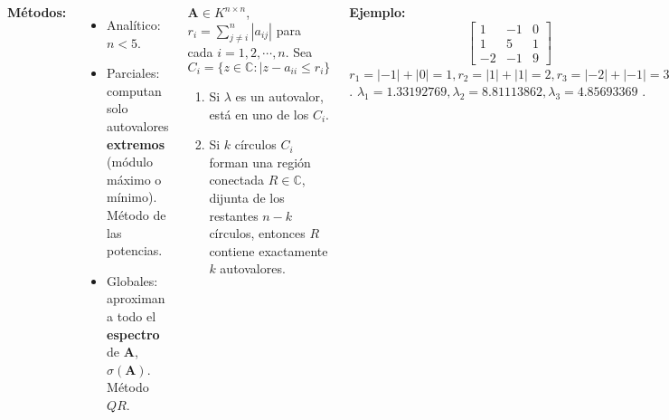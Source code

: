 \documentclass[9pt, aspectratio=169]{beamer}
\begin{document}
\begin{frame}
\begin{columns}[t]
\cx
\textbf{Métodos:}
\begin{itemize}
    \item Analítico: $n < 5$.
    \item Parciales: computan solo autovalores \textbf{extremos} (módulo máximo o mínimo). Método de las potencias.
    \item Globales: aproximan a todo el \textbf{espectro} de $\bm{A}$, $\sigma(\bm{A})$. Método $QR$.
\end{itemize}
\hrulefill \pause

\begin{theorem}
    $\bm{A} \in K^{n \times n}$, $r_i = \sum_{j \neq i}^n |a_{ij}|$ para cada $i = 1, 2, \cdots, n$. Sea
    \[ C_i = \{ z \in \mathbb{C} : |z - a_{ii} \leq r_i \} \]
    \vspace{-2em}
    \begin{enumerate}
        \item Si $\lambda$ es un autovalor, está en uno de los $C_i$.
        \item Si $k$ círculos $C_i$ forman una región conectada $R \in \mathbb{C}$, dijunta de los restantes $n - k$ círculos, entonces $R$ contiene exactamente $k$ autovalores.
    \end{enumerate}
\end{theorem} \pause

\cx
\textbf{Ejemplo:}
\[ \begin{bmatrix}
    1 & - 1 & 0 \\
    1 & 5 & 1 \\
    -2 & -1 & 9
\end{bmatrix} \]
{\small $r_1 = |-1| + |0| = 1, r_2 = |1| + |1| = 2, r_3 = |-2| + |-1| = 3$.}
{\small $\lambda_1 = 1.33192769, \lambda_2 = 8.81113862, \lambda_3 = 4.85693369$ }.
\begin{center}
    \includegraphics[width=1.0\textwidth]{figs/circles.pdf}
\end{center}
\end{columns}
\end{frame}
\end{document}
